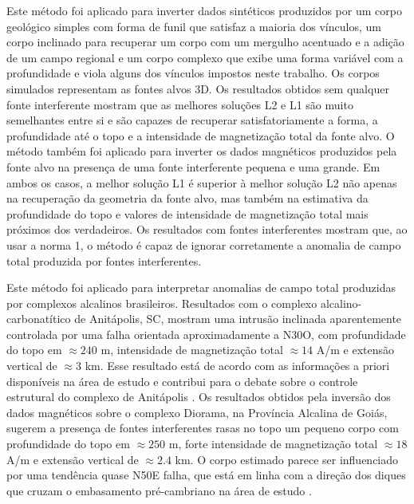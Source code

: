 Este método foi aplicado para inverter dados sintéticos produzidos por um corpo geológico simples com forma de funil que satisfaz a maioria dos vínculos, um corpo inclinado para recuperar um corpo com um mergulho acentuado e a adição de um campo regional e um corpo complexo que exibe uma forma variável com a profundidade e viola alguns dos vínculos impostos neste trabalho.
Os corpos simulados representam as fontes alvos 3D.
Os resultados obtidos sem qualquer fonte interferente mostram que as melhores soluções L2 e L1 são muito semelhantes entre si e são capazes de recuperar satisfatoriamente a forma, a profundidade até o topo e a intensidade de magnetização total da fonte alvo.
O método também foi aplicado para inverter os dados magnéticos produzidos pela fonte alvo na presença de uma fonte interferente pequena e uma grande.
Em ambos os casos, a melhor solução L1 é superior à melhor solução L2 não apenas na recuperação da geometria da fonte alvo, mas também na estimativa da profundidade do topo e valores de intensidade de magnetização total mais próximos dos verdadeiros.
Os resultados com fontes interferentes mostram que, ao usar a norma 1, o método é capaz de ignorar corretamente a anomalia de campo total produzida por fontes interferentes.

Este método foi aplicado para interpretar anomalias de campo total produzidas por complexos alcalinos brasileiros. Resultados com o complexo alcalino-carbonatítico de Anitápolis, SC, mostram uma intrusão inclinada aparentemente controlada por uma falha orientada aproximadamente a N30O, com profundidade do topo em $\approx 240$ m, intensidade de magnetização total $\approx 14$ A/m e extensão vertical de $\approx 3$ km. Esse resultado está de acordo com as informações a priori disponíveis na área de estudo e contribui para o debate sobre o controle estrutural do complexo de Anitápolis \citep{riccomini_etal2005, gomes_etal2018}.
Os resultados obtidos pela inversão dos dados magnéticos sobre o complexo Diorama, na Província Alcalina de Goiás, sugerem a presença de fontes interferentes rasas no topo um pequeno corpo com profundidade do topo em $\approx 250$ m, forte intensidade de magnetização total $\approx 18$ A/m e extensão vertical de $\approx 2.4$ km. O corpo estimado parece ser influenciado por uma tendência quase N50E falha, que está em linha com a direção dos diques que cruzam o embasamento pré-cambriano na área de estudo \citet{junqueirabrod_etal2002}.